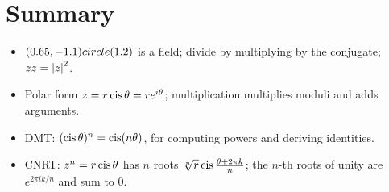 \section{Summary}
\begin{itemize}
  \item $(0.65,-1.1) circle (1.2)$ is a field; divide by multiplying by the conjugate; $z\overline{z} = \left\lvert z \right\rvert^2$.
  \item Polar form $z = r\operatorname{cis}\theta = re^{i\theta}$; multiplication multiplies moduli and adds
        arguments.
  \item DMT: $(\operatorname{cis}\theta)^n = \operatorname{cis}(n\theta)$, for computing powers and deriving identities.
  \item CNRT: $z^n = r\operatorname{cis}\theta$ has $n$ roots $\sqrt[n]r\operatorname{cis}\frac{\theta + 2\pi k}{n}$; the
        $n$-th roots of unity are $e^{2\pi ik/n}$ and sum to $0$.
\end{itemize}
